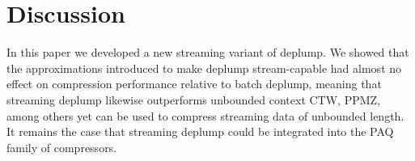 \section{Discussion}
\label{sec:discussion}

In this paper we developed a new streaming variant of deplump.  We showed that the approximations introduced to make deplump stream-capable had almost no effect on compression performance relative to batch deplump, meaning that streaming deplump likewise outperforms unbounded context CTW, PPMZ, among others yet can be used to compress streaming data of unbounded length.  It remains the case that streaming deplump could be integrated into the PAQ family of compressors. 

